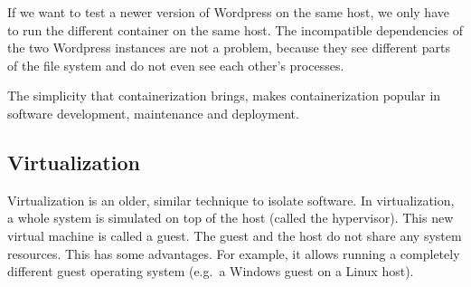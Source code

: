 If we want to test a newer version of Wordpress on the same host, we only have to run the different container on the same host. The incompatible dependencies of the two Wordpress instances are not a problem, because they see different parts of the file system and do not even see each other's processes.

\medskip

The simplicity that containerization brings, makes containerization popular in software development, maintenance and deployment.

\pagebreak

\subsection{Virtualization}
Virtualization is an older, similar technique to isolate software. In virtualization, a whole system is simulated on top of the host (called the hypervisor). This new virtual machine is called a guest. The guest and the host do not share any system resources. This has some advantages. For example, it allows running a completely different guest operating system (e.g.\ a Windows guest on a Linux host).


